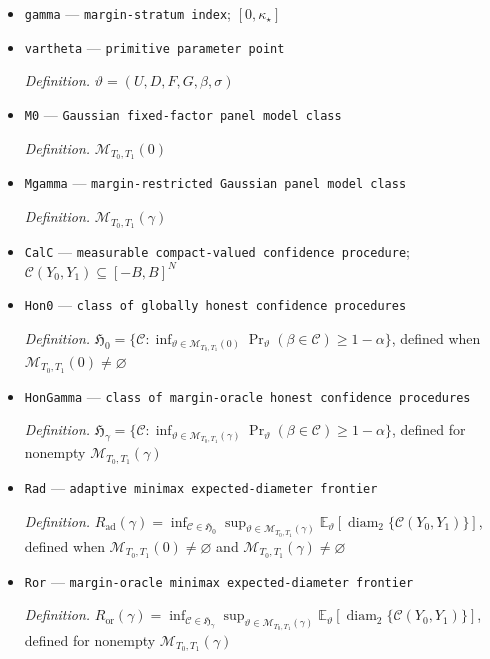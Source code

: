 \documentclass{article}
\begin{document}
\begin{itemize}
  \item \texttt{gamma} --- \texttt{margin-\allowbreak{}stratum index}; \([0,\kappa_\star]\)
  \item \texttt{vartheta} --- \texttt{primitive parameter point}
  \par\smallskip\noindent\emph{Definition.} \(\vartheta=(U,D,F,G,\beta,\sigma)\)
  \item \texttt{M0} --- \texttt{Gaussian fixed-\allowbreak{}factor panel model class}
  \par\smallskip\noindent\emph{Definition.} \(\mathcal M_{T_0,T_1}(0)\)
  \item \texttt{Mgamma} --- \texttt{margin-\allowbreak{}restricted Gaussian panel model class}
  \par\smallskip\noindent\emph{Definition.} \(\mathcal M_{T_0,T_1}(\gamma)\)
  \item \texttt{CalC} --- \texttt{measurable compact-\allowbreak{}valued confidence procedure}; \(\mathcal C(Y_0,Y_1)\subseteq[-B,B]^N\)
  \item \texttt{Hon0} --- \texttt{class of globally honest confidence procedures}
  \par\smallskip\noindent\emph{Definition.} \(\mathfrak H_0=\{\mathcal C:\inf_{\vartheta\in\mathcal M_{T_0,T_1}(0)}\Pr_\vartheta(\beta\in\mathcal C)\ge 1-\alpha\}\), defined when \(\mathcal M_{T_0,T_1}(0)\ne\varnothing\)
  \item \texttt{HonGamma} --- \texttt{class of margin-\allowbreak{}oracle honest confidence procedures}
  \par\smallskip\noindent\emph{Definition.} \(\mathfrak H_\gamma=\{\mathcal C:\inf_{\vartheta\in\mathcal M_{T_0,T_1}(\gamma)}\Pr_\vartheta(\beta\in\mathcal C)\ge 1-\alpha\}\), defined for nonempty \(\mathcal M_{T_0,T_1}(\gamma)\)
  \item \texttt{Rad} --- \texttt{adaptive minimax expected-\allowbreak{}diameter frontier}
  \par\smallskip\noindent\emph{Definition.} \(R_{\mathrm{ad}}(\gamma)=\inf_{\mathcal C\in\mathfrak H_0}\sup_{\vartheta\in\mathcal M_{T_0,T_1}(\gamma)}\mathbb E_\vartheta[\operatorname{diam}_2\{\mathcal C(Y_0,Y_1)\}]\), defined when \(\mathcal M_{T_0,T_1}(0)\ne\varnothing\) and \(\mathcal M_{T_0,T_1}(\gamma)\ne\varnothing\)
  \item \texttt{Ror} --- \texttt{margin-\allowbreak{}oracle minimax expected-\allowbreak{}diameter frontier}
  \par\smallskip\noindent\emph{Definition.} \(R_{\mathrm{or}}(\gamma)=\inf_{\mathcal C\in\mathfrak H_\gamma}\sup_{\vartheta\in\mathcal M_{T_0,T_1}(\gamma)}\mathbb E_\vartheta[\operatorname{diam}_2\{\mathcal C(Y_0,Y_1)\}]\), defined for nonempty \(\mathcal M_{T_0,T_1}(\gamma)\)

\end{itemize}
\end{document}
